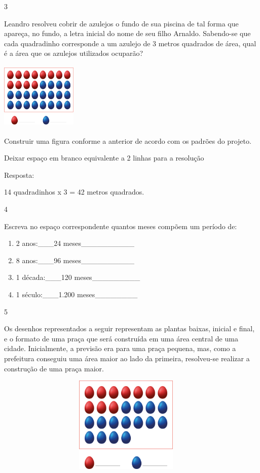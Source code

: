 \begin{mdframed}[linewidth=2pt,linecolor=salmao,roundcorner=2pt]
\begin{itemize}
{\begin{itemize}
\begin{escolha}
{\num{3}

Leandro resolveu cobrir de azulejos o fundo de sua piscina de tal forma
que apareça, no fundo, a letra inicial do nome de seu filho Arnaldo.
Sabendo-se que cada quadradinho corresponde a um azulejo de 3 metros
quadrados de área, qual é a área que os azulejos utilizados
ocuparão?

\includegraphics[width=1.42949in,height=1.25160in]{media/image63.png}

Construir uma figura conforme a anterior de acordo com os padrões do
projeto.

Deixar espaço em branco equivalente a 2 linhas para a resolução

Resposta:

14 quadradinhos x 3 = 42 metros quadrados.

\num{4}

Escreva no espaço correspondente quantos meses compõem um período de:

\begin{enumerate}
\item
  2 anos:­­­­­­­­­­­­­­­­­­­\_\_\_24 meses\_\_\_\_\_\_\_\_\_\_
\item
  8 anos:\_\_\_96 meses\_\_\_\_\_\_\_\_\_\_
\item
  1 década:\_\_\_120 meses\_\_\_\_\_\_\_\_\_
\item
  1 século:\_\_\_1.200 meses\_\_\_\_\_\_\_\_
\end{enumerate}

\num{5}

Os desenhos representados a seguir representam as plantas baixas, inicial
e final, e o formato de uma praça que será construída em uma área
central de uma cidade. Inicialmente, a previsão era para uma praça
pequena, mas, como a prefeitura conseguiu uma área maior ao lado da
primeira, resolveu-se realizar a construção de uma praça maior.

\includegraphics[width=5.00877in,height=1.80849in]{media/image64.png}

}
\end{escolha}
\end{itemize}}
\end{itemize}
\end{mdframed}
